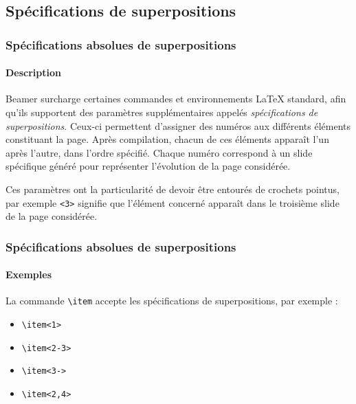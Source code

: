 \documentclass[10pt,    %
    french,             %
    xcolor=table,       %
    envcountsect,       %
    aspectratio=43      %
]{beamer}
\begin{document}
\subsection{Spécifications de superpositions}
\begin{frame}
    \frametitle{Spécifications absolues de superpositions}
    \framesubtitle{Description}
    
    Beamer surcharge certaines commandes et environnements \LaTeX{} standard, afin qu'ils supportent des paramètres supplémentaires appelés \textit{spécifications de superpositions}. Ceux-ci permettent d'assigner des numéros aux différents éléments constituant la page. Après compilation, chacun de ces éléments apparaît l'un après l'autre, dans l'ordre spécifié. Chaque numéro correspond à un slide spécifique généré pour représenter l'évolution de la page considérée.
    
    \vspace{0.25cm}
    Ces paramètres ont la particularité de devoir être entourés de crochets pointus, par exemple \texttt{<3>} signifie que l'élément concerné apparaît dans le troisième slide de la page considérée.   
\end{frame}

\begin{frame}
    \frametitle{Spécifications absolues de superpositions}
    \framesubtitle{Exemples}
    
    La commande \texttt{\textbackslash{}item} accepte les spécifications de superpositions, par exemple :
    \begin{itemize}
       \item<1> \texttt{\textbackslash{}item<1>}
       \item<2-3> \texttt{\textbackslash{}item<2-3>}
       \item<3-> \texttt{\textbackslash{}item<3->}
       \item<2,4> \texttt{\textbackslash{}item<2,4>}
    \end{itemize}
    
    \vspace{0.25cm}
    
    \vspace{0.25cm}
\end{frame}
\end{document}
